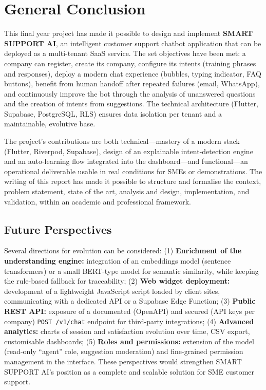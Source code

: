 \documentclass[12pt,a4paper]{report}
\begin{document}
\chapter*{General Conclusion}

This final year project has made it possible to design and implement \textbf{SMART SUPPORT AI}, an intelligent customer support chatbot application that can be deployed as a multi-tenant SaaS service. The set objectives have been met: a company can register, create its company, configure its intents (training phrases and responses), deploy a modern chat experience (bubbles, typing indicator, FAQ buttons), benefit from human handoff after repeated failures (email, WhatsApp), and continuously improve the bot through the analysis of unanswered questions and the creation of intents from suggestions. The technical architecture (Flutter, Supabase, PostgreSQL, RLS) ensures data isolation per tenant and a maintainable, evolutive base.

The project's contributions are both technical---mastery of a modern stack (Flutter, Riverpod, Supabase), design of an explainable intent-detection engine and an auto-learning flow integrated into the dashboard---and functional---an operational deliverable usable in real conditions for SMEs or demonstrations. The writing of this report has made it possible to structure and formalise the context, problem statement, state of the art, analysis and design, implementation, and validation, within an academic and professional framework.

\section*{Future Perspectives}

Several directions for evolution can be considered: (1) \textbf{Enrichment of the understanding engine:} integration of an embeddings model (sentence transformers) or a small BERT-type model for semantic similarity, while keeping the rule-based fallback for traceability; (2) \textbf{Web widget deployment:} development of a lightweight JavaScript script loaded by client sites, communicating with a dedicated API or a Supabase Edge Function; (3) \textbf{Public REST API:} exposure of a documented (OpenAPI) and secured (API keys per company) \texttt{POST /v1/chat} endpoint for third-party integrations; (4) \textbf{Advanced analytics:} charts of session and satisfaction evolution over time, CSV export, customisable dashboards; (5) \textbf{Roles and permissions:} extension of the model (read-only ``agent'' role, suggestion moderation) and fine-grained permission management in the interface. These perspectives would strengthen SMART SUPPORT AI's position as a complete and scalable solution for SME customer support.

\end{document}
